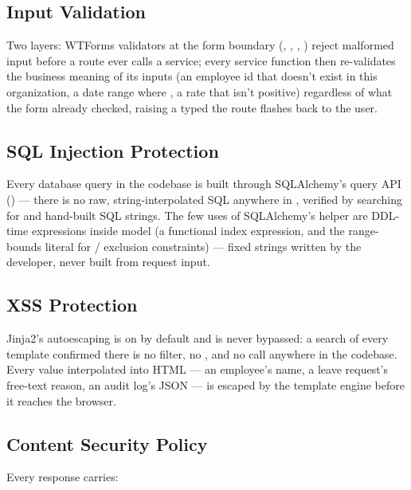 \subsection*{Input Validation}

Two layers: WTForms validators at the form boundary (,
, , ) reject malformed
input before a route ever calls a service; every service function then
re-validates the business meaning of its inputs (an employee id that
doesn't exist in this organization, a date range where , a rate that isn't positive) regardless of what the form already
checked, raising a typed  the route flashes back
to the user.

\subsection*{SQL Injection Protection}

Every database query in the codebase is built through SQLAlchemy's
query API () --- there is no
raw, string-interpolated SQL anywhere in , verified by
searching for  and hand-built SQL strings. The few
uses of SQLAlchemy's  helper are DDL-time expressions
inside model  (a functional index expression,
and the  range-bounds literal for
\allowbreak/
exclusion constraints) --- fixed strings written by the developer, never
built from request input.

\subsection*{XSS Protection}

Jinja2's autoescaping is on by default and is never bypassed: a search
of every template confirmed there is no  filter, no
, and no  call
anywhere in the codebase. Every value interpolated into HTML --- an
employee's name, a leave request's free-text reason, an audit log's
JSON  --- is escaped by the template engine before it
reaches the browser.

\subsection*{Content Security Policy}

Every response carries:

